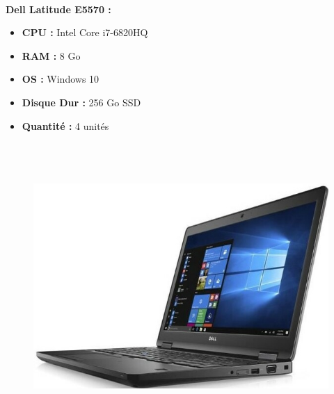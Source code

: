 \documentclass[11pt,a4paper,twoside]{article}
\begin{document}
\paragraph{}\textbf{Dell Latitude E5570 :} \\
\begin{itemize}
\item \textbf{CPU :} Intel Core i7-6820HQ
\item \textbf{RAM :} 8 Go
\item \textbf{OS :} Windows 10
\item \textbf{Disque Dur :} 256 Go SSD
\item \textbf{Quantité :} 4 unités
\\ \\ \\ \\
\end{itemize}
\begin{figure}
\includegraphics[scale=0.4]{Ressources/Materiel/L5580.jpg}\vspace{-2cm}
\end{figure}
\end{document}

